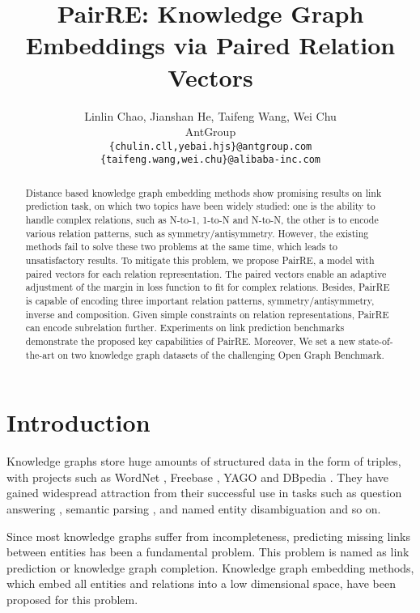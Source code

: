 \documentclass[11pt,a4paper]{article}
\title{PairRE: Knowledge Graph Embeddings via Paired Relation Vectors}
\author{Linlin Chao, Jianshan He, Taifeng Wang, Wei Chu \\
    AntGroup \\
  \texttt{\{chulin.cll,yebai.hjs\}@antgroup.com} \\ 
  \texttt{\{taifeng.wang,wei.chu\}@alibaba-inc.com} 
 }
\date{}
\begin{document}
\maketitle
\begin{abstract}
Distance based knowledge graph embedding methods show promising results on link prediction task, on which two topics have been widely studied: 
one is the ability to handle complex relations, such as N-to-1, 1-to-N and N-to-N, 
the other is to encode various relation patterns, such as symmetry/antisymmetry.
However, the existing methods fail to solve these two problems at the same time, which leads to unsatisfactory results.
To mitigate this problem, we propose PairRE, a model with paired vectors for each relation representation. 
The paired vectors enable an adaptive adjustment of the margin in loss function to fit for complex relations. Besides, PairRE is capable of encoding three important relation patterns, symmetry/antisymmetry, inverse and composition.
Given simple constraints on relation representations, PairRE can encode subrelation further.
Experiments on link prediction benchmarks demonstrate the proposed key capabilities of PairRE. Moreover, We set a
new state-of-the-art on two knowledge graph datasets of the challenging Open Graph Benchmark.
\end{abstract}

\section{Introduction}

Knowledge graphs store huge amounts of structured data in the form of triples, with projects such as WordNet \cite{miller1995wordnet}, Freebase  \cite{bollacker2008freebase}, YAGO \cite{suchanek2007yago} and DBpedia \cite{lehmann2015dbpedia}.
They have gained widespread attraction from their successful use in tasks such as question answering \cite{bordes2014open}, semantic parsing \cite{berant2013semantic}, and named entity disambiguation \cite{zheng2012entity} and so on.

Since most knowledge graphs suffer from incompleteness, predicting missing links between entities has been a fundamental problem.
This problem is named as link prediction or knowledge graph completion.
Knowledge graph embedding methods, which embed all entities and relations into a low dimensional space, have been proposed for this problem.
\end{document}
